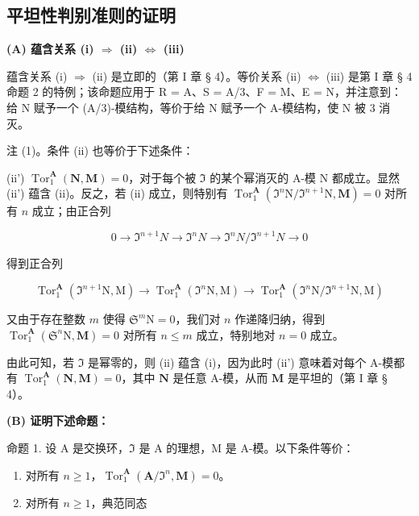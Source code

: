 \subsection{平坦性判别准则的证明}

\textbf{(A) 蕴含关系 (i) \(\Rightarrow\) (ii) \(\Leftrightarrow\) (iii)}\par

蕴含关系 (i) \(\Rightarrow\) (ii) 是立即的（第 I 章 § 4）。等价关系 (ii) \(\Leftrightarrow\) (iii) 是第 I 章 § 4 命题 2 的特例；该命题应用于 R = A、S = A/3、F = M、E = N，并注意到：给 N 赋予一个 (A/3)-模结构，等价于给 N 赋予一个 A-模结构，使 N 被 3 消灭。

注 (1)。条件 (ii) 也等价于下述条件：

(ii') \(\operatorname{Tor}_1^{\mathbf{A}}(\mathbf{N},\mathbf{M}) = 0\)，对于每个被 \(\Im\) 的某个幂消灭的 A-模 N 都成立。显然 (ii') 蕴含 (ii)。反之，若 (ii) 成立，则特别有 \(\operatorname{Tor}_1^{\mathbf{A}}(\Im^n\mathrm{N} / \Im^{n + 1}\mathrm{N},\mathbf{M}) = 0\) 对所有 \(n\) 成立；由正合列

\[
0 \rightarrow \Im^ {n + 1} N \rightarrow \Im^ {n} N \rightarrow \Im^ {n} N / \Im^ {n + 1} N \rightarrow 0
\]

得到正合列

\[
\operatorname{Tor} _ {1} ^ {\mathbf {A}} \left(\Im^ {n + 1} \mathrm{N}, \mathrm{M}\right)\rightarrow \operatorname{Tor} _ {1} ^ {\mathbf {A}} \left(\Im^ {n} \mathrm{N}, \mathrm{M}\right)\rightarrow \operatorname{Tor} _ {1} ^ {\mathbf {A}} \left(\Im^ {n} \mathrm{N} / \Im^ {n + 1} \mathrm{N}, \mathrm{M}\right)
\]

又由于存在整数 \(m\) 使得 \(\mathfrak{S}^m\mathrm{N} = 0\)，我们对 \(n\) 作递降归纳，得到 \(\operatorname{Tor}_1^{\mathbf{A}}(\mathfrak{S}^n\mathrm{N},\mathbf{M}) = 0\) 对所有 \(n\leqslant m\) 成立，特别地对 \(n = 0\) 成立。

由此可知，若 \(\Im\) 是幂零的，则 (ii) 蕴含 (i)，因为此时 (ii') 意味着对每个 A-模都有 \(\operatorname{Tor}_1^{\mathbf{A}}(\mathbf{N},\mathbf{M}) = 0\)，其中 \(\mathbf{N}\) 是任意 A-模，从而 \(\mathbf{M}\) 是平坦的（第 I 章 § 4）。

\textbf{(B) 证明下述命题：}\par

命题 1. 设 A 是交换环，\(\mathfrak{I}\) 是 A 的理想，M 是 A-模。以下条件等价：

\begin{enumerate}
\def\labelenumi{(\alph{enumi})}
\item
  对所有 \(n \geqslant 1\)，\(\operatorname{Tor}_1^{\mathbf{A}}(\mathbf{A}/\mathfrak{I}^n, \mathbf{M}) = 0\)。
\item
  对所有 \(n \geqslant 1\)，典范同态
\end{enumerate}

